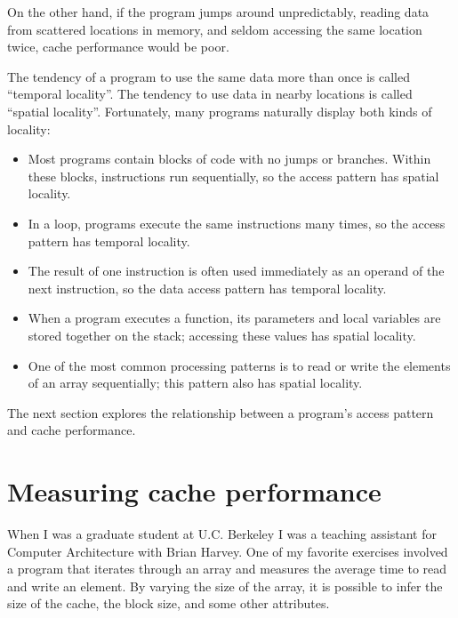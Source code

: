 \documentclass[12pt]{book}
\begin{document}
{On the other hand, if the program jumps around unpredictably,
reading data from scattered locations in memory, and seldom
accessing the same location twice, cache performance would be
poor.

The tendency of a program to use the same data more than once is
called ``temporal locality''.  The tendency to use data in nearby
locations is called ``spatial locality''.  Fortunately, many
programs naturally display both kinds of locality:

\begin{itemize}

\item Most programs contain blocks of code with no jumps or
branches.  Within these blocks, instructions run
sequentially, so the access pattern has
spatial locality.

\item In a loop, programs execute the same instructions many
times, so the access pattern has temporal locality.

\item The result of one instruction is often used immediately as
an operand of the next instruction, so the data access pattern
has temporal locality.

\item When a program executes a function, its parameters and local
variables are stored together on the stack; accessing these values
has spatial locality.

\item One of the most common processing patterns is to read or write
the elements of an array sequentially; this pattern also has
spatial locality.

\end{itemize}

The next section explores the relationship
between a program's access pattern and cache performance.


\section{Measuring cache performance}

When I was a graduate student at U.C. Berkeley I was a teaching
assistant for Computer Architecture with Brian Harvey.  One of my
favorite exercises involved a program that iterates through an array
and measures the average time to read and write an element.  By
varying the size of the array, it is possible to infer the size
of the cache, the block size, and some other attributes.

}
\end{document}
